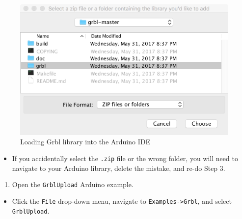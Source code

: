 \documentclass[]{book}
\providecommand{\tightlist}{%
  \setlength{\itemsep}{0pt}\setlength{\parskip}{0pt}}
\theoremstyle{definition}
\theoremstyle{definition}
\theoremstyle{remark}
\begin{document}
\begin{figure}

{\centering \includegraphics[width=0.75\linewidth]{images/add_grbl_lib} 

}

\caption{Loading Grbl library into the Arduino IDE}\label{fig:addGrblLib}
\end{figure}

\begin{itemize}
\tightlist
\item
  If you accidentally select the \texttt{.zip} file or the wrong folder,
  you will need to navigate to your Arduino library, delete the mistake,
  and re-do Step 3.
\end{itemize}

\begin{enumerate}
\def\labelenumi{\arabic{enumi}.}
\setcounter{enumi}{3}
\tightlist
\item
  Open the \texttt{GrblUpload} Arduino example.
\end{enumerate}

\begin{itemize}
\tightlist
\item
  Click the \texttt{File} drop-down menu, navigate to
  \texttt{Examples-\textgreater{}Grbl}, and select \texttt{GrblUpload}.
\end{itemize}
\end{document}
